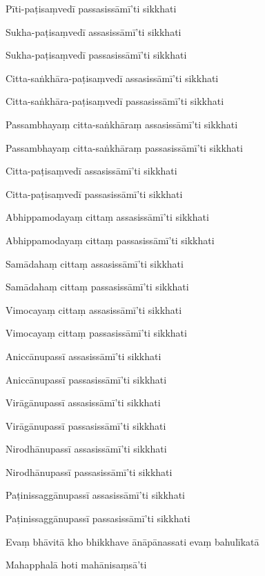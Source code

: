 {Pīti-paṭisaṃvedī passasissāmī'ti sikkhati

Sukha-paṭisaṃvedī assasissāmī'ti sikkhati

Sukha-paṭisaṃvedī passasissāmī'ti sikkhati

Citta-saṅkhāra-paṭisaṃvedī assasissāmī'ti sikkhati

Citta-saṅkhāra-paṭisaṃvedī passasissāmī'ti sikkhati

Passambhayaṃ citta-saṅkhāraṃ assasissāmī'ti sikkhati

Passambhayaṃ citta-saṅkhāraṃ passasissāmī'ti sikkhati

Citta-paṭisaṃvedī assasissāmī'ti sikkhati

Citta-paṭisaṃvedī passasissāmī'ti sikkhati

Abhippamodayaṃ cittaṃ assasissāmī'ti sikkhati

Abhippamodayaṃ cittaṃ passasissāmī'ti sikkhati

Samādahaṃ cittaṃ assasissāmī'ti sikkhati

Samādahaṃ cittaṃ passasissāmī'ti sikkhati

Vimocayaṃ cittaṃ assasissāmī'ti sikkhati

Vimocayaṃ cittaṃ passasissāmī'ti sikkhati

Aniccānupassī assasissāmī'ti sikkhati

Aniccānupassī passasissāmī'ti sikkhati

Virāgānupassī assasissāmī'ti sikkhati

Virāgānupassī passasissāmī'ti sikkhati

Nirodhānupassī assasissāmī'ti sikkhati

Nirodhānupassī passasissāmī'ti sikkhati

Paṭinissaggānupassī assasissāmī'ti sikkhati

Paṭinissaggānupassī passasissāmī'ti sikkhati

Evaṃ bhāvitā kho bhikkhave ānāpānassati evaṃ bahulīkatā

Mahapphalā hoti mahānisaṃsā'ti


}

